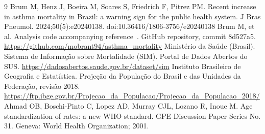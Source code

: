 \documentclass[11pt,a4paper]{article}
\begin{document}
\begin{thebibliography}{9}
 Brum M, Henz J, Boeira M, Soares S, Friedrich F, Pitrez PM. Recent increase in asthma mortality in Brazil: a warning sign for the public health system. J Bras Pneumol. 2024;50(5):e20240138. doi:10.36416/1806-3756/e20240138
 Brum M, et al. Analysis code accompanying reference~\cite{antunes2024}. GitHub repository, commit 8d527a5. \url{https://github.com/mobrant94/asthma_mortality}
 Ministério da Saúde (Brasil). Sistema de Informação sobre Mortalidade (SIM). Portal de Dados Abertos do SUS. \url{https://dadosabertos.saude.gov.br/dataset/sim}
 Instituto Brasileiro de Geografia e Estatística. Projeção da População do Brasil e das Unidades da Federação, revisão 2018. \url{https://ftp.ibge.gov.br/Projecao_da_Populacao/Projecao_da_Populacao_2018/}
 Ahmad OB, Boschi-Pinto C, Lopez AD, Murray CJL, Lozano R, Inoue M. Age standardization of rates: a new WHO standard. GPE Discussion Paper Series No. 31. Geneva: World Health Organization; 2001.
\end{thebibliography}
\end{document}
